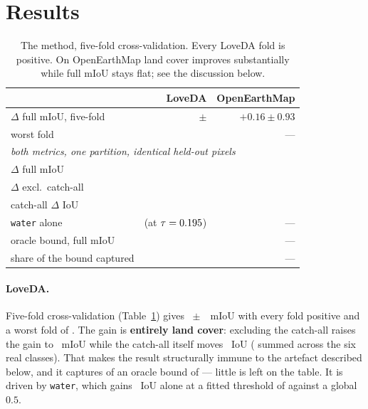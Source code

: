 \documentclass[10pt,a4paper]{article}                        %
\newcommand{\best}[1]{\textbf{#1}}
\begin{document}
\section{Results}
\label{sec:results}

\begin{table}[t]\centering\small
\caption{The method, five-fold cross-validation. Every LoveDA fold is positive.
On OpenEarthMap land cover improves substantially while full mIoU stays flat;
see the discussion below.}
\label{tab:method}
\begin{tabular}{lrr}
\toprule
 & LoveDA & OpenEarthMap \\
\midrule
$\Delta$ full mIoU, five-fold    & \best{\methodGain{} $\pm$ \methodSD{}} & $+0.16 \pm 0.93$ \\
worst fold                      & \methodWorst{} & --- \\
\midrule
\multicolumn{3}{l}{\emph{both metrics, one partition, identical held-out pixels}}\\
$\Delta$ full mIoU              & \mrLoveFull{} & \mrOemFull{} \\
$\Delta$ excl.\ catch-all       & \best{\mrLoveReal{}} & \best{\mrOemReal{}} \\
catch-all $\Delta$ IoU          & \mrLoveBg{} & \mrOemBg{} \\
\midrule
\texttt{water} alone            & \methodWater{} (at $\tau=0.195{}$) & --- \\
oracle bound, full mIoU         & \oracleBound{} & --- \\
share of the bound captured     & \oracleShare{} & --- \\
\bottomrule
\end{tabular}
\end{table}

\paragraph{LoveDA.} Five-fold cross-validation (Table~\ref{tab:method}) gives
\methodGain{}~$\pm$~\methodSD{}~mIoU with every fold positive and a worst fold of
\methodWorst{}. The gain is \best{entirely land cover}: excluding the catch-all
raises the gain to \methodLandMean{}~mIoU while the catch-all itself moves
\methodBg{}~IoU (\methodLand{} summed across the six real classes). That makes
the result structurally immune to the artefact described below, and it captures
\oracleShare{} of an oracle bound of \oracleBound{} --- little is left on the
table. It is driven by \texttt{water}, which gains \methodWater{}~IoU alone at a
fitted threshold of \methodWaterTau{} against a global $0.5$.
\end{document}
